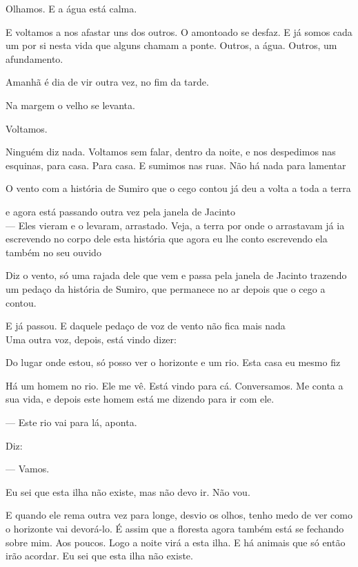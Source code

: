 Olhamos. E a água está calma.

E voltamos a nos afastar uns dos outros. O amontoado se desfaz. E já
somos cada um por si nesta vida que alguns chamam a ponte. Outros, a
água. Outros, um afundamento.

Amanhã é dia de vir outra vez, no fim da tarde.

Na margem o velho se levanta.

Voltamos.

Ninguém diz nada. Voltamos sem falar, dentro da noite, e nos despedimos
nas esquinas, para casa. Para casa. E sumimos nas ruas. Não há nada para
lamentar

\pagebreak

\clearpage
\thispagestyle{empty}

\movetooddpage

\vspace*{4cm}

O vento com a história de Sumiro que o cego contou já deu a volta a toda
a terra

e agora está passando outra vez pela janela de Jacinto\\

--- Eles vieram e o levaram, arrastado. Veja, a terra por onde o
arrastavam já ia escrevendo no corpo dele esta história que agora eu lhe
conto escrevendo ela também no seu ouvido

Diz o vento, só uma rajada dele que vem e passa pela janela de Jacinto
trazendo um pedaço da história de Sumiro, que permanece no ar depois que
o cego a contou.

E já passou. E daquele pedaço de voz de vento não fica mais nada\\

Uma outra voz, depois, está vindo dizer:

Do lugar onde estou, só posso ver o horizonte e um rio. Esta casa eu
mesmo fiz

Há um homem no rio. Ele me vê. Está vindo para cá. Conversamos. Me conta
a sua vida, e depois este homem está me dizendo para ir com ele.

--- Este rio vai para lá, aponta.

Diz:

--- Vamos.

Eu sei que esta ilha não existe, mas não devo ir. Não vou.

E quando ele rema outra vez para longe, desvio os olhos, tenho medo de
ver como o horizonte vai devorá-lo. É assim que a floresta agora também
está se fechando sobre mim. Aos poucos. Logo a noite virá a esta ilha. E
há animais que só então irão acordar. Eu sei que esta ilha não existe.

